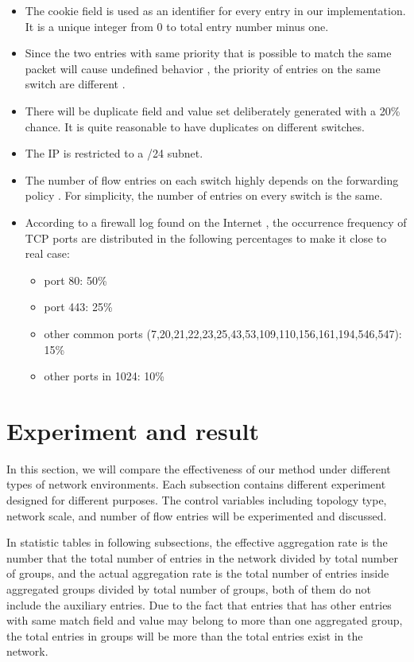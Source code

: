 \begin{itemize}
\item 
The cookie field is used as an identifier for every entry in our implementation. It is a unique integer from 0 to total entry number minus one.\sout{}
\item
Since the two entries with same priority that is possible to match the same packet will cause undefined behavior \cite{OF_SPEC}, the priority of entries on the same switch are different .
\item
There will be duplicate field and value set deliberately generated with a 20\% chance. It is quite reasonable to have duplicates on different switches. 
\item
The IP is restricted to a /24 subnet.
\item
The number of flow entries on each switch highly depends on the forwarding policy \cite{MPFHMRSV09}. For simplicity, the number of entries on every switch is the same. 
\item
According to a firewall log found on the Internet \cite{PORT_FREQ}, the occurrence frequency of TCP ports are distributed in the following percentages to make it close to real case:
\begin{itemize}
\item
port 80: 50\%
\item
port 443: 25\%
\item
other common ports (7,20,21,22,23,25,43,53,109,110,156,161,194,546,547): 15\%
\item
other ports in 1024: 10\%
\end{itemize}
\end{itemize}

\section{Experiment and result}
In this section, we will compare the effectiveness of our method under different types of network environments. Each subsection contains different experiment designed for different purposes. The control variables including topology type, network scale, and number of flow entries will be experimented and discussed. 

In statistic tables in following subsections, the effective aggregation rate is the number that the total number of entries in the network divided by total number of groups, and the actual aggregation rate is the total number of entries inside aggregated groups divided by total number of groups, both of them do not include the auxiliary entries. Due to the fact that entries that has other entries with same match field and value may belong to more than one aggregated group, the total entries in groups will be more than the total entries exist in the network. 

